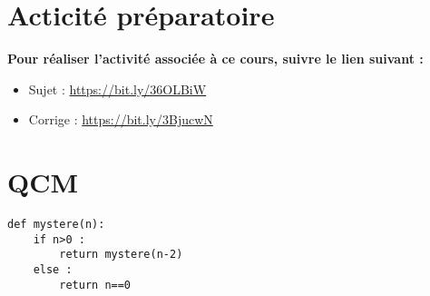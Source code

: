 %
%



\section{Acticité préparatoire}
\textbf{Pour réaliser l'activité associée à ce cours, suivre le lien suivant : }
\begin{itemize} 
\item Sujet : \url{https://bit.ly/36OLBiW}
\item Corrige : \url{https://bit.ly/3BjucwN}
\end{itemize}

\newpage
\section{QCM}

\begin{lstlisting}
def mystere(n):
    if n>0 :
        return mystere(n-2)
    else :
        return n==0
\end{lstlisting}

